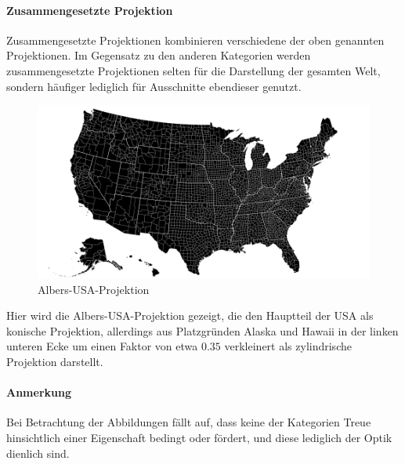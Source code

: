 \paragraph{Zusammengesetzte Projektion}

Zusammengesetzte Projektionen kombinieren verschiedene der oben genannten Projektionen. Im Gegensatz zu den anderen Kategorien werden zusammengesetzte Projektionen selten für die Darstellung der gesamten Welt, sondern häufiger lediglich für Ausschnitte ebendieser genutzt.

\begin{figure}[H]
    \centering
    
    \includegraphics[width=.5\textwidth]{images/albersUSA}
    \caption{Albers-USA-Projektion}
\end{figure}

Hier wird die Albers-USA-Projektion gezeigt, die den Hauptteil der USA als konische Projektion, allerdings aus Platzgründen Alaska und Hawaii in der linken unteren Ecke um einen Faktor von etwa $0.35$ verkleinert als zylindrische Projektion darstellt.

\paragraph{Anmerkung}

Bei Betrachtung der Abbildungen fällt auf, dass keine der Kategorien Treue hinsichtlich einer Eigenschaft bedingt oder fördert, und diese lediglich der Optik dienlich sind.
